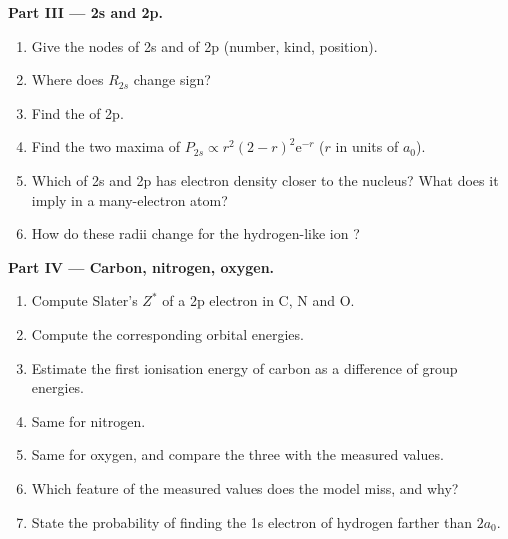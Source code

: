 \begin{problem}
\medskip
\noindent\textbf{Part III --- 2s and 2p.}
\begin{enumerate}[resume]
  \item Give the nodes of 2s and of 2p (number, kind, position).
  \item Where does $R_{2s}$ change sign?
  \item Find the  of 2p.
  \item Find the two maxima of $P_{2s} \propto r^2(2 - r)^2\mathrm e^{-r}$ ($r$ in units of
        $a_0$).
  \item Which of 2s and 2p has electron density closer to the nucleus? What does
        it imply in a many-electron atom?
  \item How do these radii change for the hydrogen-like ion ?
\end{enumerate}

\medskip
\noindent\textbf{Part IV --- Carbon, nitrogen, oxygen.}
\begin{enumerate}[resume]
  \item Compute Slater's $Z^*$ of a 2p electron in C, N and O.
  \item Compute the corresponding orbital energies.
  \item Estimate the first ionisation energy of carbon as a difference of group
        energies.
  \item Same for nitrogen.
  \item Same for oxygen, and compare the three with the measured values.
  \item Which feature of the measured values does the model miss, and why?
  \item State the probability of finding the 1s electron of hydrogen farther
        than $2a_0$.
\end{enumerate}
\end{problem}
